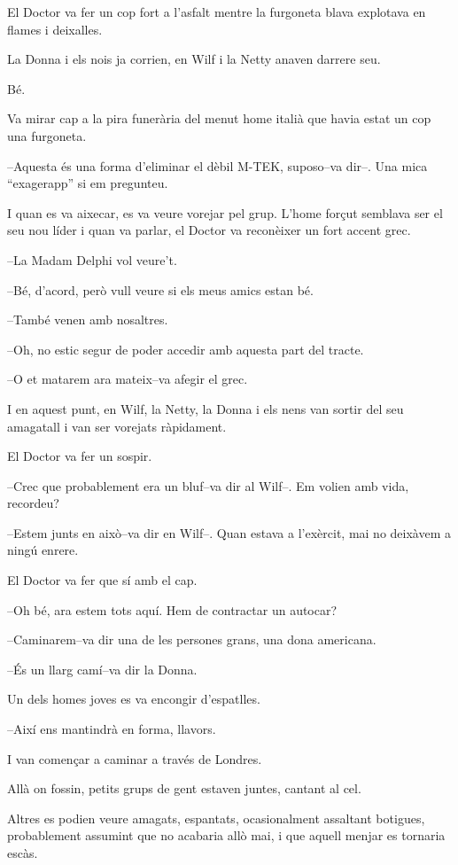 El Doctor va fer un cop fort a l'asfalt mentre la furgoneta blava
explotava en flames i deixalles.

La Donna i els nois ja corrien, en Wilf i la Netty anaven darrere seu.

Bé.

Va mirar cap a la pira funerària del menut home italià que havia estat
un cop una furgoneta.

--Aquesta és una forma d'eliminar el dèbil M-TEK, suposo--va dir--. Una
mica ``exagerapp'' si em pregunteu.

I quan es va aixecar, es va veure vorejar pel grup. L'home forçut
semblava ser el seu nou líder i quan va parlar, el Doctor va reconèixer
un fort accent grec.

--La Madam Delphi vol veure't.

--Bé, d'acord, però vull veure si els meus amics estan bé.

--També venen amb nosaltres.

--Oh, no estic segur de poder accedir amb aquesta part del tracte.

--O et matarem ara mateix--va afegir el grec.

I en aquest punt, en Wilf, la Netty, la Donna i els nens van sortir del
seu amagatall i van ser vorejats ràpidament.

El Doctor va fer un sospir.

--Crec que probablement era un bluf--va dir al Wilf--. Em volien amb
vida, recordeu?

--Estem junts en això--va dir en Wilf--. Quan estava a l'exèrcit, mai no
deixàvem a ningú enrere.

El Doctor va fer que sí amb el cap.

--Oh bé, ara estem tots aquí. Hem de contractar un autocar?

--Caminarem--va dir una de les persones grans, una dona americana.

--És un llarg camí--va dir la Donna.

Un dels homes joves es va encongir d'espatlles.

--Així ens mantindrà en forma, llavors.

I van començar a caminar a través de Londres.

Allà on fossin, petits grups de gent estaven juntes, cantant al cel.

Altres es podien veure amagats, espantats, ocasionalment assaltant
botigues, probablement assumint que no acabaria allò mai, i que aquell
menjar es tornaria escàs.

